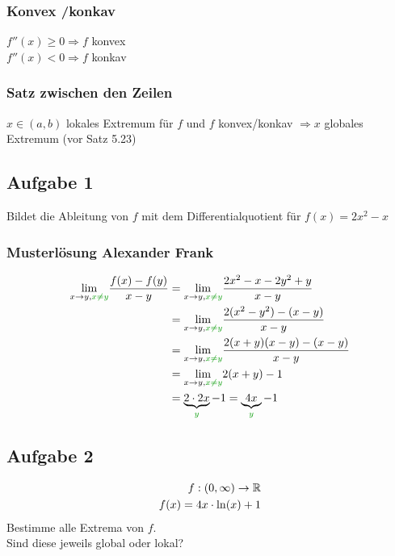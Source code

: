 \subsubsection{Konvex /konkav}
$f''(x) \geq 0 \Rightarrow f$ konvex\\
$f''(x) < 0 \Rightarrow f$ konkav
\subsubsection{Satz zwischen den Zeilen}
$x \in (a,b)$ lokales Extremum für $f$ und $f$ konvex/konkav $\Rightarrow x$ globales Extremum (vor Satz 5.23)

\subsection{Aufgabe 1}
Bildet die Ableitung von $f$ mit dem Differentialquotient für $f(x) = 2x^2 - x$

\subsubsection{Musterlösung Alexander Frank}
\begin{align*}
    \underset{x \rightarrow y, \textcolor{green!60!black}{x \neq y}}{\lim} \frac{f(x) - f(y)}{x - y} &= \underset{x \rightarrow y, \textcolor{green!60!black}{x \neq y}}{\lim} \frac{2x^2 - x - 2y^2 + y}{x - y} \\
    &= \underset{x \rightarrow y, \textcolor{green!60!black}{x \neq y}}{\lim} \frac{2(x ^2 - y^2) - (x - y)}{x - y}\\
    &= \underset{x \rightarrow y, \textcolor{green!60!black}{x \neq y}}{\lim} \frac{2(x + y) (x - y) - (x - y)}{x-y} \\
    &= \underset{x \rightarrow y, \textcolor{green!60!black}{x \neq y}}{\lim} 2(x +y) - 1 \\
    &= \underbrace{2 \cdot 2x}_{\textcolor{green!60!black}{y}} - 1 = \underbrace{4x}_{\textcolor{green!60!black}{y}} - 1
\end{align*}

\subsection{Aufgabe 2}
\begin{align*}
    f: (0, \infty) \rightarrow \mathbb R\\
    f(x) = 4x \cdot \ln (x) + 1
\end{align*}
Bestimme alle Extrema von $f$.\\
Sind diese jeweils global oder lokal?

